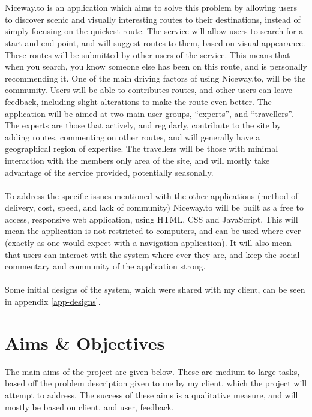 \documentclass[a4paper,twoside,notitlepage,11pt]{article}
\begin{document}
\ \\
\ \\
Niceway.to is an application which aims to solve this problem by allowing users to discover scenic and visually interesting routes to their destinations, instead of simply focusing on the quickest route. The service will allow users to search for a start and end point, and will suggest routes to them, based on visual appearance. These routes will be submitted by other users of the service. This means that when you search, you know someone else has been on this route, and is personally recommending it. One of the main driving factors of using Niceway.to, will be the community. Users will be able to contributes routes, and other users can leave feedback, including slight alterations to make the route even better. The application will be aimed at two main user groups, ``experts'', and ``travellers''. The experts are those that actively, and regularly, contribute to the site by adding routes, commenting on other routes, and will generally have a geographical region of expertise. The travellers will be those with minimal interaction with the members only area of the site, and will mostly take advantage of the service provided, potentially seasonally.
\ \\
\ \\
To address the specific issues mentioned with the other applications (method of delivery, cost, speed, and lack of community) Niceway.to will be built as a free to access, responsive web application, using HTML, CSS and JavaScript. This will mean the application is not restricted to computers, and can be used where ever (exactly as one would expect with a navigation application). It will also mean that users can interact with the system where ever they are, and keep the social commentary and community of the application strong.\ \\
\ \\
Some initial designs of the system, which were shared with my client, can be seen in appendix \ref{app-designs}.

\newpage 
\section{Aims \& Objectives}
The main aims of the project are given below. These are medium to large tasks, based off the problem description given to me by my client, which the project will attempt to address. The success of these aims is a qualitative measure, and will mostly be based on client, and user, feedback.
\end{document}
